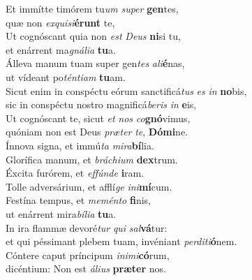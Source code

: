 \evenverse Et immítte timórem tu\textit{um} \textit{su}\textit{per} \textbf{gen}tes,~\*\\
\evenverse quæ non \textit{ex}\textit{qui}\textit{si}\textbf{é}\textbf{runt} te,\\
\oddverse Ut cognóscant quia non \textit{est} \textit{De}\textit{us} \textbf{ni}si tu,~\*\\
\oddverse et enárrent ma\textit{gná}\textit{li}\textit{a} \textbf{tu}a.\\
\evenverse Álleva manum tuam super gen\textit{tes} \textit{a}\textit{li}\textbf{é}nas,~\*\\
\evenverse ut vídeant po\textit{tén}\textit{ti}\textit{am} \textbf{tu}am.\\
\oddverse Sicut enim in conspéctu eórum sanctificá\textit{tus} \textit{es} \textit{in} \textbf{no}bis,~\*\\
\oddverse sic in conspéctu nostro magnificá\textit{be}\textit{ris} \textit{in} \textbf{e}is,\\
\evenverse Ut cognóscant te, sicut \textit{et} \textit{nos} \textit{co}\textbf{gnó}vimus,~\*\\
\evenverse quóniam non est Deus \textit{præ}\textit{ter} \textit{te}, \textbf{Dó}\textbf{mi}ne.\\
\oddverse Ínnova signa, et immú\textit{ta} \textit{mi}\textit{ra}\textbf{bí}lia.~\*\\
\oddverse Glorífica manum, et \textit{brá}\textit{chi}\textit{um} \textbf{dex}trum.\\
\evenverse Éxcita furórem, et \textit{ef}\textit{fún}\textit{de} \textbf{i}ram.~\*\\
\evenverse Tolle adversárium, et afflí\textit{ge} \textit{i}\textit{ni}\textbf{mí}cum.\\
\oddverse Festína tempus, et \textit{me}\textit{mén}\textit{to} \textbf{fi}nis,~\*\\
\oddverse ut enárrent mira\textit{bí}\textit{li}\textit{a} \textbf{tu}a.\\
\evenverse In ira flammæ devoré\textit{tur} \textit{qui} \textit{sal}\textbf{vá}tur:~\*\\
\evenverse et qui péssimant plebem tuam, invéniant \textit{per}\textit{di}\textit{ti}\textbf{ó}nem.\\
\oddverse Cóntere caput príncipum \textit{i}\textit{ni}\textit{mi}\textbf{có}rum,~\*\\
\oddverse dicéntium: Non est \textit{á}\textit{li}\textit{us} \textbf{præ}\textbf{ter} nos.\\
